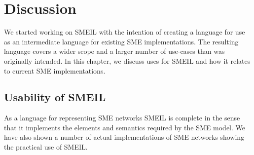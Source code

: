 \chapter{Discussion}


We started working on SMEIL with the intention of creating a language for use as
an intermediate language for existing SME implementations. The resulting
language covers a wider scope and a larger number of use-cases than was
originally intended. In this chapter, we discuss uses for SMEIL and how it
relates to current SME implementations.






\section{Usability of SMEIL}
As a language for representing SME networks SMEIL is complete in the sense that
it implements the elements and semantics required by the SME model. We have also
shown a number of actual implementations of SME networks showing the practical
use of SMEIL.


